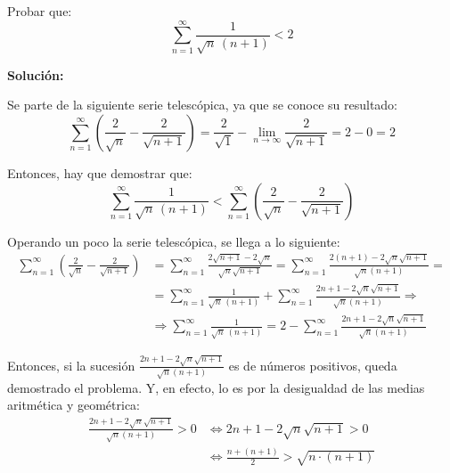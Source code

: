 \documentclass[../../main.tex]{subfiles}
\begin{document}
  \begin{shaded}
    Probar que:
    $$
    \sum_{n = 1}^\infty \frac{1}{\sqrt{n} \, (n + 1)} < 2
    $$
  \end{shaded}

  \textbf{Solución:}

  Se parte de la siguiente serie telescópica, ya que se conoce su resultado:
  $$
  \sum_{n = 1}^\infty \left(\frac{2}{\sqrt{n}} - \frac{2}{\sqrt{n + 1}} \right) = \frac{2}{\sqrt{1}} - \lim_{n \to \infty} \frac{2}{\sqrt{n + 1}} = 2 - 0 = 2
  $$

  Entonces, hay que demostrar que:
  $$
  \sum_{n = 1}^\infty \frac{1}{\sqrt{n} \, (n + 1)} < \sum_{n = 1}^\infty \left(\frac{2}{\sqrt{n}} - \frac{2}{\sqrt{n + 1}} \right)
  $$

  Operando un poco la serie telescópica, se llega a lo siguiente:
  \begin{equation*}
    \begin{split}
      \sum_{n = 1}^\infty \left(\frac{2}{\sqrt{n}} - \frac{2}{\sqrt{n + 1}} \right) &= \sum_{n = 1}^\infty \frac{2\sqrt{n + 1} - 2\sqrt{n}}{\sqrt{n} \sqrt{n + 1}} = \sum_{n = 1}^\infty \frac{2(n + 1) - 2\sqrt{n}\sqrt{n + 1}}{\sqrt{n} (n + 1)} = 
      \\
      & =
      \sum_{n = 1}^\infty \frac{1}{\sqrt{n} \, (n + 1)} + \sum_{n = 1}^\infty \frac{2n + 1 - 2\sqrt{n}\sqrt{n + 1}}{\sqrt{n} (n + 1)} \Longrightarrow
      \\
      & \Longrightarrow \sum_{n = 1}^\infty \frac{1}{\sqrt{n} \, (n + 1)} = 2 - \sum_{n = 1}^\infty \frac{2n + 1 - 2\sqrt{n}\sqrt{n + 1}}{\sqrt{n} (n + 1)}
    \end{split}
  \end{equation*}

  Entonces, si la sucesión $\displaystyle\frac{2n + 1 - 2\sqrt{n}\sqrt{n + 1}}{\sqrt{n} (n + 1)}$ es de números positivos, queda demostrado el problema. Y, en efecto, lo es por la desigualdad de las medias aritmética y geométrica:
  \begin{equation*}
    \begin{split}
      \frac{2n + 1 - 2\sqrt{n}\sqrt{n + 1}}{\sqrt{n} (n + 1)} > 0 & \iff
      2n + 1 - 2\sqrt{n}\sqrt{n + 1} > 0 \\ & \iff
      \frac{n + (n + 1)}{2} > \sqrt{n \cdot (n + 1)}
    \end{split}
  \end{equation*}
\end{document}
